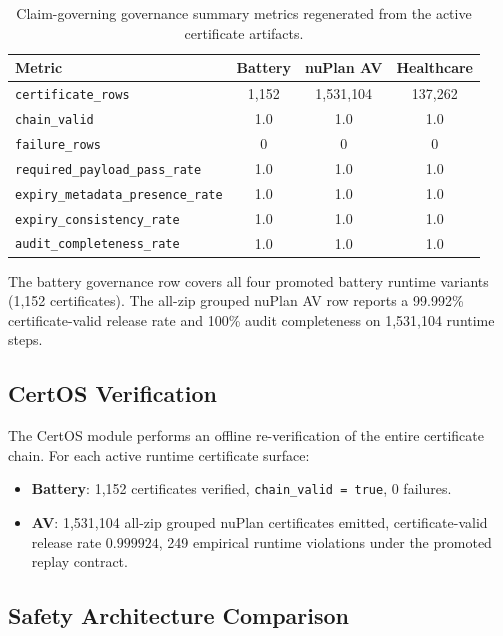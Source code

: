 \begin{table}[t]
\caption{Claim-governing governance summary metrics regenerated from the active
certificate artifacts.}
\label{tab:governance_metrics}
\centering\small
\begin{tabular}{lccc}
\toprule
\textbf{Metric} & \textbf{Battery} & \textbf{nuPlan AV} & \textbf{Healthcare} \\
\midrule
\texttt{certificate\_rows} & 1{,}152 & 1{,}531{,}104 & 137{,}262 \\
\texttt{chain\_valid} & 1.0 & 1.0 & 1.0 \\
\texttt{failure\_rows} & 0 & 0 & 0 \\
\texttt{required\_payload\_pass\_rate} & 1.0 & 1.0 & 1.0 \\
\texttt{expiry\_metadata\_presence\_rate} & 1.0 & 1.0 & 1.0 \\
\texttt{expiry\_consistency\_rate} & 1.0 & 1.0 & 1.0 \\
\texttt{audit\_completeness\_rate} & 1.0 & 1.0 & 1.0 \\
\bottomrule
\end{tabular}
\end{table}

The battery governance row covers all four promoted battery runtime variants
(1{,}152 certificates).  The all-zip grouped nuPlan AV row reports a 99.992\%
certificate-valid release rate and 100\% audit completeness on 1{,}531{,}104
runtime steps.

\subsection{CertOS Verification}

The CertOS module performs an offline re-verification of the entire certificate chain.
For each active runtime certificate surface:
\begin{itemize}[nosep]
  \item \textbf{Battery}: 1{,}152 certificates verified, \texttt{chain\_valid = true},
        0 failures.
  \item \textbf{AV}: 1{,}531{,}104 all-zip grouped nuPlan certificates emitted,
        certificate-valid release rate $0.999924$,
        249 empirical runtime violations under the promoted replay contract.
\end{itemize}

\subsection{Safety Architecture Comparison}

